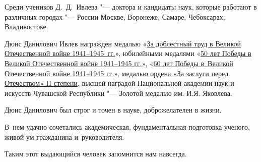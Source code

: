 Среди учеников Д.~Д.~Ивлева "--- доктора и кандидаты наук, которые работают в различных городах "--- России Москве, Воронеже, Самаре, Чебоксарах, Владивостоке.



Дюис Данилович Ивлев награжден медалью «\href{https://goo.gl/JnU888}{За доблестный труд в Великой Отечественной войне 1941–1945~гг.}», юбилейными медалями «\href{https://goo.gl/iLsZdZ}{50 лет Победы в Великой Отечественной войне 1941–1945 гг.}», «\href{https://goo.gl/P89MgT}{60 лет Победы в~Великой Отечественной войне 1941–1945 гг.}», \href{https://goo.gl/jz1tSp}{медалью ордена «За заслуги перед Отечеством» II степени}, высшей наградой Национальной академии наук и искусств Чувашской Республики "--- Золотой медалью им. И.Я. Яковлева.



Дюис Данилович был строг и точен в науке, доброжелателен в жизни. 

В~нем удачно сочетались академическая, фундаментальная подготовка ученого, живой ум гражданина и~руководителя. 

Таким этот выдающийся человек запомнится нам навсегда.



\renewcommand{\baselinestretch}{0.9}



\pagebreak




